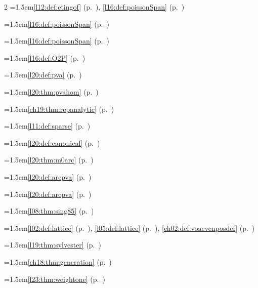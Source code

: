\begin{multicols}{2}
\hangindent=1.5em\quad \ref{l12:def:etingof} (p.~\pageref{l12:def:etingof}), \ref{l16:def:poissonSpan} (p.~\pageref{l16:def:poissonSpan})\par
\hangindent=1.5em\quad \ref{l16:def:poissonSpan} (p.~\pageref{l16:def:poissonSpan})\par
\hangindent=1.5em\quad \ref{l16:def:poissonSpan} (p.~\pageref{l16:def:poissonSpan})\par
\hangindent=1.5em\quad \ref{l16:def:O2P} (p.~\pageref{l16:def:O2P})\par
\hangindent=1.5em\quad \ref{l20:def:pva} (p.~\pageref{l20:def:pva})\par
\hangindent=1.5em\quad \ref{l20:thm:pvahom} (p.~\pageref{l20:thm:pvahom})\par
\hangindent=1.5em\quad \ref{ch19:thm:repanalytic} (p.~\pageref{ch19:thm:repanalytic})\par
\hangindent=1.5em\quad \ref{l11:def:sparse} (p.~\pageref{l11:def:sparse})\par
\hangindent=1.5em\quad \ref{l20:def:canonical} (p.~\pageref{l20:def:canonical})\par
\hangindent=1.5em\quad \ref{l20:thm:m0arc} (p.~\pageref{l20:thm:m0arc})\par
\hangindent=1.5em\quad \ref{l20:def:arcpva} (p.~\pageref{l20:def:arcpva})\par
\hangindent=1.5em\quad \ref{l20:def:arcpva} (p.~\pageref{l20:def:arcpva})\par
\hangindent=1.5em\quad \ref{l08:thm:sing85} (p.~\pageref{l08:thm:sing85})\par
\hangindent=1.5em\quad \ref{l02:def:lattice} (p.~\pageref{l02:def:lattice}), \ref{l05:def:lattice} (p.~\pageref{l05:def:lattice}), \ref{ch02:def:voaevenposdef} (p.~\pageref{ch02:def:voaevenposdef})\par
\hangindent=1.5em\quad \ref{l19:thm:sylvester} (p.~\pageref{l19:thm:sylvester})\par
\hangindent=1.5em\quad \ref{ch18:thm:generation} (p.~\pageref{ch18:thm:generation})\par
\hangindent=1.5em\quad \ref{l23:thm:weightone} (p.~\pageref{l23:thm:weightone})\par

\end{multicols}

